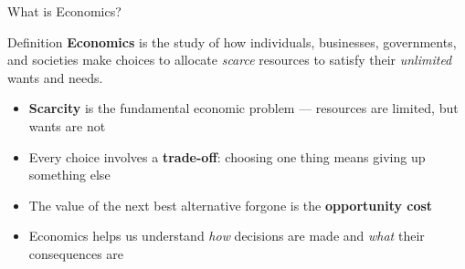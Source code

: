 \documentclass[aspectratio=169]{beamer}
\begin{document}
\begin{frame}{What is Economics?}

\begin{block}{Definition}
  \textbf{Economics} is the study of how individuals, businesses, governments, and societies make choices to allocate \textit{scarce} resources to satisfy their \textit{unlimited} wants and needs.
\end{block}
\vspace{0.4em}
\begin{itemize}
  \item \textbf{Scarcity} is the fundamental economic problem --- resources are limited, but wants are not
  \item Every choice involves a \textbf{trade-off}: choosing one thing means giving up something else
  \item The value of the next best alternative forgone is the \textbf{opportunity cost}
  \item Economics helps us understand \textit{how} decisions are made and \textit{what} their consequences are
\end{itemize}
\end{frame}
\end{document}
